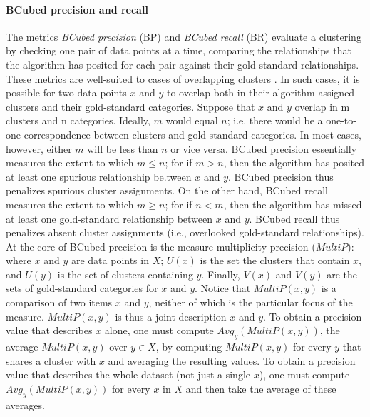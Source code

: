 \paragraph{BCubed precision and recall}
The metrics \emph{BCubed precision} (BP) and \emph{BCubed recall} (BR) \citep{bagga-and-baldwin:1998} evaluate a clustering by checking one 
pair of data points at a time, comparing the relationships that the algorithm has posited for each pair against their 
gold-standard relationships. These metrics are well-suited to cases of overlapping clusters \citep{amigo-et-al:2009}. 
In such cases, it is possible for two data points $x$ and $y$ to overlap both in their algorithm-assigned clusters and their 
gold-standard categories. Suppose that $x$ and $y$ overlap in m clusters and n categories. Ideally, $m$ would 
equal $n$; 
i.e. there would be a one-to-one correspondence between clusters and gold-standard categories. 
In most cases, however, either $m$ will be less than $n$ or vice versa. BCubed precision essentially 
measures the extent to which $m \leq n$; for if $m>n$, then the algorithm has posited at least one 
spurious relationship be.tween $x$ and $y$. BCubed precision thus penalizes spurious cluster assignments. 
On the other hand, BCubed recall measures the extent to which $m \geq n$; for if $n<m$, then the algorithm 
has missed at least one gold-standard relationship between $x$ and $y$. BCubed recall thus 
penalizes absent cluster assignments (i.e., overlooked gold-standard relationships). 
At the core of BCubed precision is the measure multiplicity precision ($MultiP$):
where $x$ and $y$ are data points in $X$; $U(x)$ is the set the clusters that contain $x$, 
and $U(y)$ is the set of clusters containing $y$.
Finally, 
$V(x)$ and $V(y)$ are the sets of gold-standard categories for $x$ and $y$. 
Notice that $MultiP(x,y)$ is a comparison of two items $x$ and $y$, neither of which is the 
particular focus of the measure. $MultiP(x,y)$ is thus a joint description $x$ and $y$. 
To obtain a precision value that describes $x$ alone, one must compute $Avg_{y}(MultiP (x,y))$, the 
average $MultiP(x,y)$ over $y \in X$, by computing $MultiP(x,y)$ for every $y$ that shares a cluster with $x$ 
and averaging the resulting values. To obtain a precision value that describes the whole dataset (not just a single $x$), 
one must compute $Avg_y(MultiP(x,y))$ for every $x$ in $X$ and then take the average of these averages. 
